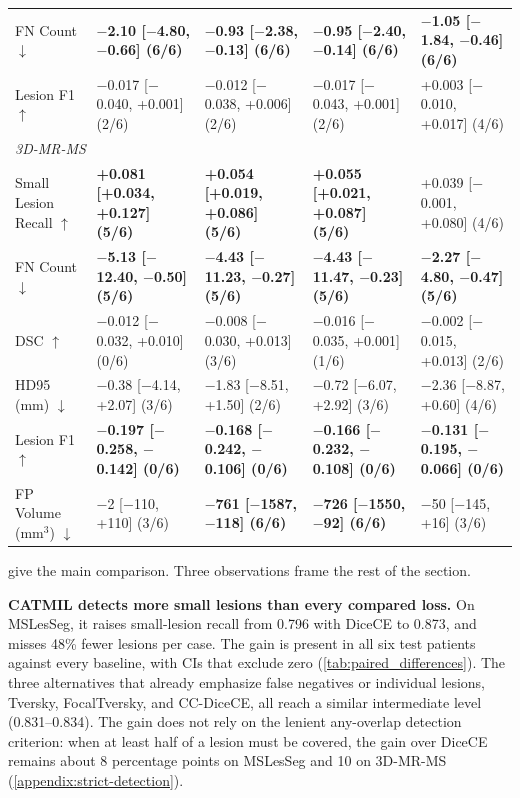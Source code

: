 \begin{table}[t]
{\begin{tabular}{lllll}
FN Count $\downarrow$ & \textbf{$-$2.10 [$-$4.80, $-$0.66] (6/6)} & \textbf{$-$0.93 [$-$2.38, $-$0.13] (6/6)} & \textbf{$-$0.95 [$-$2.40, $-$0.14] (6/6)} & \textbf{$-$1.05 [$-$1.84, $-$0.46] (6/6)} \\
Lesion F1 $\uparrow$ & $-$0.017 [$-$0.040, +0.001] (2/6) & $-$0.012 [$-$0.038, +0.006] (2/6) & $-$0.017 [$-$0.043, +0.001] (2/6) & +0.003 [$-$0.010, +0.017] (4/6) \\
\midrule
\multicolumn{5}{l}{\emph{3D-MR-MS}} \\
Small Lesion Recall $\uparrow$ & \textbf{+0.081 [+0.034, +0.127] (5/6)} & \textbf{+0.054 [+0.019, +0.086] (5/6)} & \textbf{+0.055 [+0.021, +0.087] (5/6)} & +0.039 [$-$0.001, +0.080] (4/6) \\
FN Count $\downarrow$ & \textbf{$-$5.13 [$-$12.40, $-$0.50] (5/6)} & \textbf{$-$4.43 [$-$11.23, $-$0.27] (5/6)} & \textbf{$-$4.43 [$-$11.47, $-$0.23] (5/6)} & \textbf{$-$2.27 [$-$4.80, $-$0.47] (5/6)} \\
DSC $\uparrow$ & $-$0.012 [$-$0.032, +0.010] (0/6) & $-$0.008 [$-$0.030, +0.013] (3/6) & $-$0.016 [$-$0.035, +0.001] (1/6) & $-$0.002 [$-$0.015, +0.013] (2/6) \\
HD95 (mm) $\downarrow$ & $-$0.38 [$-$4.14, +2.07] (3/6) & $-$1.83 [$-$8.51, +1.50] (2/6) & $-$0.72 [$-$6.07, +2.92] (3/6) & $-$2.36 [$-$8.87, +0.60] (4/6) \\
Lesion F1 $\uparrow$ & \textbf{$-$0.197 [$-$0.258, $-$0.142] (0/6)} & \textbf{$-$0.168 [$-$0.242, $-$0.106] (0/6)} & \textbf{$-$0.166 [$-$0.232, $-$0.108] (0/6)} & \textbf{$-$0.131 [$-$0.195, $-$0.066] (0/6)} \\
FP Volume (mm$^3$) $\downarrow$ & $-$2 [$-$110, +110] (3/6) & \textbf{$-$761 [$-$1587, $-$118] (6/6)} & \textbf{$-$726 [$-$1550, $-$92] (6/6)} & $-$50 [$-$145, +16] (3/6) \\
\bottomrule
\end{tabular}%
}
\end{table}

 give the
main comparison. Three observations frame the rest of the section.

\textbf{CATMIL detects more small lesions than every compared loss.} On
MSLesSeg, it raises small-lesion recall from 0.796 with DiceCE to 0.873,
and misses 48\% fewer lesions per case. The gain is present in all six test
patients against every baseline, with CIs that exclude zero
(\cref{tab:paired_differences}). The three alternatives that already
emphasize false negatives or individual lesions, Tversky, FocalTversky, and
CC-DiceCE, all reach a similar intermediate level (0.831--0.834). The
gain does not rely on the lenient any-overlap detection criterion: when at
least half of a lesion must be covered, the gain over DiceCE remains about
8 percentage points on MSLesSeg and 10 on 3D-MR-MS
(\cref{appendix:strict-detection}).

